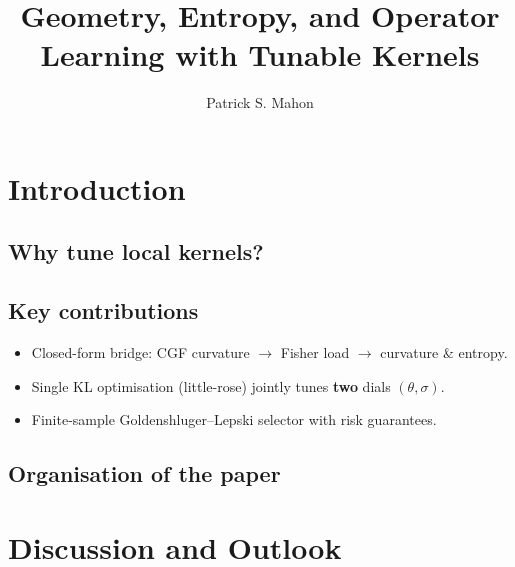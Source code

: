 \documentclass{article}
\begin{document}
\title{Geometry, Entropy, and Operator Learning with Tunable Kernels}
\author{Patrick S. Mahon}
\maketitle



\tableofcontents


\section{Introduction}
  \subsection{Why tune local kernels?}
  \subsection{Key contributions}
    \begin{itemize}[leftmargin=*,nosep]
    \item Closed-form bridge: CGF curvature $\to$ Fisher load $\to$ curvature \& entropy.
    \item Single KL optimisation (little-rose) jointly tunes \textbf{two} dials $(\theta,\sigma)$.
    \item Finite-sample Goldenshluger–Lepski selector with risk guarantees.
    \end{itemize}
  \subsection{Organisation of the paper}



\section{Discussion and Outlook}
\end{document}
